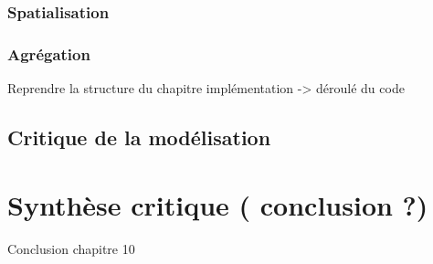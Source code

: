\subsubsection{Spatialisation}
\label{subsec:10-3-2-2}

\subsubsection{Agrégation}
\label{subsec:10-3-2-3}

Reprendre la structure du chapitre implémentation -> déroulé du code

\subsection{Critique de la modélisation}
\label{subsec:10-3-3}

\section{Synthèse  critique ( conclusion ?) }
\label{sec:10-4}


Conclusion chapitre 10

